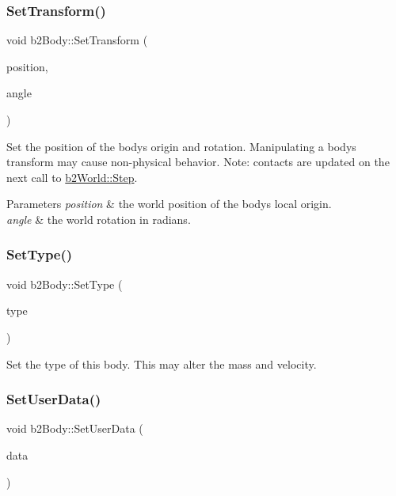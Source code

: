 \subsubsection{\texorpdfstring{SetTransform()}{SetTransform()}}
{\footnotesize\ttfamily void b2\+Body\+::\+Set\+Transform (\begin{DoxyParamCaption}\item[{const \mbox{\hyperlink{structb2_vec2}{b2\+Vec2}} \&}]{position,  }\item[{\mbox{\hyperlink{b2_settings_8h_aacdc525d6f7bddb3ae95d5c311bd06a1}{float32}}}]{angle }\end{DoxyParamCaption})}

Set the position of the body\textquotesingle{}s origin and rotation. Manipulating a body\textquotesingle{}s transform may cause non-\/physical behavior. Note\+: contacts are updated on the next call to \mbox{\hyperlink{classb2_world_a7a8eff61af98461f978fe43f3af7be90}{b2\+World\+::\+Step}}. 
\begin{DoxyParams}{Parameters}
{\em position} & the world position of the body\textquotesingle{}s local origin. \\
\hline
{\em angle} & the world rotation in radians. \\
\hline
\end{DoxyParams}
\mbox{\label{classb2_body_a34ff1c84b10b74eb990749a025a1b1ad}} 
\subsubsection{\texorpdfstring{SetType()}{SetType()}}
{\footnotesize\ttfamily void b2\+Body\+::\+Set\+Type (\begin{DoxyParamCaption}\item[{\mbox{\hyperlink{b2_body_8h_a74ddb02261648c2bff691a866b5c03e0}{b2\+Body\+Type}}}]{type }\end{DoxyParamCaption})}



Set the type of this body. This may alter the mass and velocity. 

\mbox{\label{classb2_body_a5553a5ecdfd2d7200ba2405ce6043f52}} 
\subsubsection{\texorpdfstring{SetUserData()}{SetUserData()}}
{\footnotesize\ttfamily void b2\+Body\+::\+Set\+User\+Data (\begin{DoxyParamCaption}\item[{void $\ast$}]{data }\end{DoxyParamCaption})\hspace{0.3cm}{\ttfamily [inline]}}



